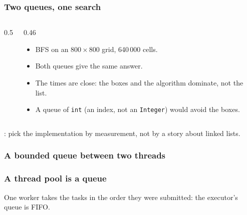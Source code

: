 \documentclass[aspectratio=169,10pt,compress]{beamer}
\begin{document}
\begin{frame}[t,fragile] \frametitle{Two queues, one search}
  \begin{columns}[T]
    \begin{column}{0.5\textwidth}
    \end{column}
    \begin{column}{0.46\textwidth}
      \begin{itemize}\small
        \item BFS on an $800\times800$ grid, 640\,000 cells.
        \item Both queues give the same answer.
        \item The times are close: the boxes and the algorithm dominate, not the list.
        \item A queue of \texttt{int} (an index, not an \texttt{Integer}) would avoid the boxes.
      \end{itemize}
    \end{column}
  \end{columns}
  \vspace{0.3em}
  \small {}: pick the implementation by measurement, not by a story about linked lists.
\end{frame}




\begin{frame}[t,fragile] \frametitle{A bounded queue between two threads}
\end{frame}




\begin{frame}[t,fragile] \frametitle{A thread pool is a queue}
  \small One worker takes the tasks in the order they were submitted: the executor's queue is FIFO.
\end{frame}
\end{document}
